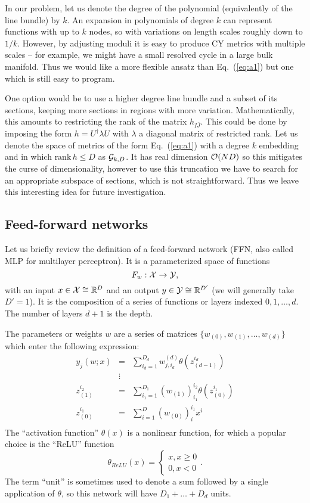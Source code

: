 \documentclass[12pt]{article}
\def\IR{\mathbb{R}}
\def\CO {{\cal O}}
\def\CX {{\cal X}}
\def\CG {{\cal G}}
\def\CY{{\cal Y}}
\newcommand{\eq}[1]{Eq.~(\ref{eq:#1})}
\newcommand{\be}{\begin{equation}}
\newcommand{\ee}{\end{equation}}
\newcommand{\bea}{\begin{eqnarray}}
\newcommand{\eea}{\end{eqnarray}}
\def\bJ{{\bar{J}}}
\begin{document}
In our problem, 
let us denote the degree of the polynomial (equivalently of the line bundle) by $k$.  An expansion
in polynomials of degree $k$ can represent functions with up to $k$ nodes, so with variations on
length scales roughly down to $1/k$.  However,
by adjusting moduli it is easy to produce CY metrics with multiple scales -- for example,
we might have a small resolved cycle in a large bulk manifold.  Thus we would like a more flexible
ansatz than \eq{a1} but one which is still easy to program.  

One option would be to use a higher
degree line bundle and a subset of its sections, keeping more sections in regions with more variation.
Mathematically, this amounts to restricting the rank of the matrix $h_{I\bJ}$.
This could be done by imposing the form $h=U^\dag \lambda U$ with $\lambda$ a
diagonal matrix of restricted rank.
Let us denote the space of metrics of the form \eq{a1} 
with a degree $k$ embedding and in which $\mbox{rank}\, h \le D$ as $\CG_{k,D}$.
It has real dimension $\CO(ND)$ so this mitigates the curse of dimensionality, however to use this truncation we
have to search for an appropriate subspace of sections, which is not straightforward.  Thus we leave this
interesting idea for future investigation.

\subsection{ Feed-forward networks }

Let us briefly review the definition of a feed-forward network (FFN, also called
MLP for multilayer perceptron).  It is
a parameterized space of functions
\be \label{eq:defF}
F_w : \CX \rightarrow \CY ,
\ee
with an input $x\in\CX \cong \IR^D$ and an output $y\in \CY\cong \IR^{D'}$ (we will generally take $D'=1$).
It is the composition of a series of functions or layers indexed $0,1,\ldots,d$.  The number
of layers $d+1$ is the depth.

The parameters or weights $w$ are a series of matrices $\{ w_{(0)},w_{(1)},\ldots,w_{(d)} \}$ which enter the 
following expression:
\bea \label{eq:defFy}
y_j(w;x) &=& \sum_{i_d=1}^{D_d} w^{(d)}_{j,i_d} \theta( z_{(d-1)}^{i_d} )\\
 &\vdots & \nonumber \\ \label{eq:defF2}
  z_{(1)}^{i_2} &=& \sum_{i_1=1}^{D_1} (w_{(1)})^{i_2}_{i_1} \theta( z_{(0)}^{i_1} )\\
  \label{eq:defF1}
 z_{(0)}^{i_1} &=& \sum_{i=1}^D (w_{(0)})^{i_1}_i x^i \\
\eea
The ``activation function'' $\theta(x)$ is a nonlinear function, for which a popular choice is
the ``ReLU'' function 
\be
\theta_{ReLU}(x) = \begin{cases} x, x\ge 0 \\ 0, x<0 \end{cases}.
\ee
The term ``unit'' is sometimes used to denote a sum followed by a single application of $\theta$,
so this network will have $D_1+\ldots+D_d$ units.
\end{document}
